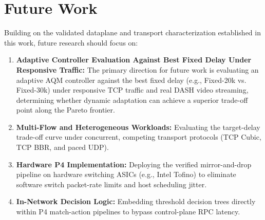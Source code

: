 \documentclass[12pt,a4paper,oneside]{report}
\begin{document}
\section{Future Work}
\label{sec:future_work}
Building on the validated dataplane and transport characterization established in this work, future research should focus on:
\begin{enumerate}[label=\arabic*.]
  \item \textbf{Adaptive Controller Evaluation Against Best Fixed Delay Under Responsive Traffic:} The primary direction for future work is evaluating an adaptive AQM controller against the best fixed delay (e.g., Fixed-20k vs. Fixed-30k) under responsive TCP traffic and real DASH video streaming, determining whether dynamic adaptation can achieve a superior trade-off point along the Pareto frontier.
  \item \textbf{Multi-Flow and Heterogeneous Workloads:} Evaluating the target-delay trade-off curve under concurrent, competing transport protocols (TCP Cubic, TCP BBR, and paced UDP).
  \item \textbf{Hardware P4 Implementation:} Deploying the verified mirror-and-drop pipeline on hardware switching ASICs (e.g., Intel Tofino) to eliminate software switch packet-rate limits and host scheduling jitter.
  \item \textbf{In-Network Decision Logic:} Embedding threshold decision trees directly within P4 match-action pipelines to bypass control-plane RPC latency.
\end{enumerate}
\end{document}
